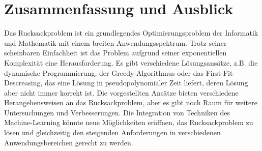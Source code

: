 \documentclass[12pt]{report}
\begin{document}
\newpage
\chapter{Zusammenfassung und Ausblick}
Das Rucksackproblem ist ein grundlegendes Optimierungsproblem der Informatik und Mathematik mit einem breiten Anwendungsspektrum. Trotz seiner scheinbaren Einfachheit ist das Problem aufgrund seiner exponentiellen Komplexität eine Herausforderung. Es gibt verschiedene Lösungsansätze, z.B. die dynamische Programmierung, der Greedy-Algorithmus oder das First-Fit-Descreasing, das eine Lösung in pseudopolynomialer Zeit liefert, deren Lösung aber nicht immer korrekt ist. Die vorgestellten Ansätze bieten verschiedene Herangehensweisen an das Rucksackproblem, aber es gibt noch Raum für weitere Untersuchungen und Verbesserungen. Die Integration von Techniken des Machine-Learning könnte neue Möglichkeiten eröffnen, das Rucksackproblem zu lösen und gleichzeitig den steigenden Anforderungen in verschiedenen Anwendungsbereichen gerecht zu werden.

\newpage
{}
\setcounter{page}{\value{frontmatterPage}} %
\addtocounter{page}{1}

\renewcommand{\refname}{Literaturverzeichnis}


\end{document}
